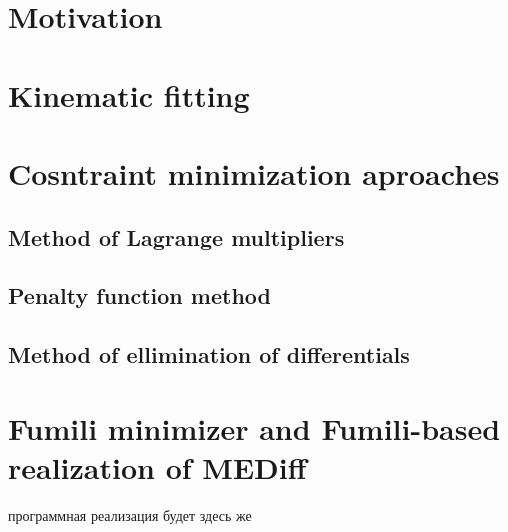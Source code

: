 \documentclass{webofc}
\begin{document}

%



\section{Motivation}
\section{Kinematic fitting}

\section{Cosntraint minimization aproaches}
  \subsection{Method of Lagrange multipliers}
  
  \subsection{Penalty function method}
  
  \subsection{Method of ellimination of differentials}
  
\section{Fumili minimizer and Fumili-based realization of MEDiff}

  программная реализация будет здесь же
 
\end{document}
